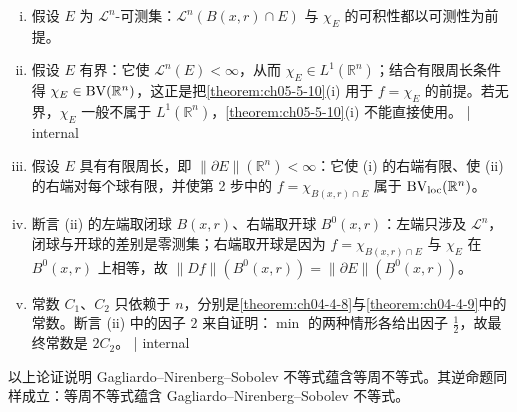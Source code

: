 ﻿\documentclass[../../main.tex]{subfiles}%
\begin{document}
\begin{remark}\label{remark:ch05-thm-5-11-条件}
\begin{enumerate}[(i)]
\item 假设 $E$ 为 $\mathcal{L}^n$-可测集：$\mathcal{L}^n(B(x,r)\cap E)$ 与 $\chi_E$ 的可积性都以可测性为前提。
\item 假设 $E$ 有界：它使 $\mathcal{L}^n(E)<\infty$，从而 $\chi_E\in L^1(\mathbb{R}^n)$；结合有限周长条件得 $\chi_E\in\mathrm{BV}(\mathbb{R}^n)$，这正是把\cref{theorem:ch05-5-10}(i) 用于 $f=\chi_E$ 的前提。若无界，$\chi_E$ 一般不属于 $L^1(\mathbb{R}^n)$，\cref{theorem:ch05-5-10}(i) 不能直接使用。 | internal %
\item 假设 $E$ 具有有限周长，即 $\lVert\partial E\rVert(\mathbb{R}^n)<\infty$：它使 (i) 的右端有限、使 (ii) 的右端对每个球有限，并使第 2 步中的 $f=\chi_{B(x,r)\cap E}$ 属于 $\mathrm{BV}_{\mathrm{loc}}(\mathbb{R}^n)$。
\item 断言 (ii) 的左端取闭球 $B(x,r)$、右端取开球 $B^0(x,r)$：左端只涉及 $\mathcal{L}^n$，闭球与开球的差别是零测集；右端取开球是因为 $f=\chi_{B(x,r)\cap E}$ 与 $\chi_E$ 在 $B^0(x,r)$ 上相等，故 $\lVert Df\rVert(B^0(x,r))=\lVert\partial E\rVert(B^0(x,r))$。
\item 常数 $C_1$、$C_2$ 只依赖于 $n$，分别是\cref{theorem:ch04-4-8}与\cref{theorem:ch04-4-9}中的常数。断言 (ii) 中的因子 $2$ 来自证明：$\min$ 的两种情形各给出因子 $\frac12$，故最终常数是 $2C_2$。 | internal %
\end{enumerate}
\end{remark}

\begin{remark}\label{remark:ch05-thm-5-11-逆命题}
以上论证说明 Gagliardo--Nirenberg--Sobolev 不等式蕴含等周不等式。其逆命题同样成立：等周不等式蕴含 Gagliardo--Nirenberg--Sobolev 不等式。
\end{remark}
\end{document}
